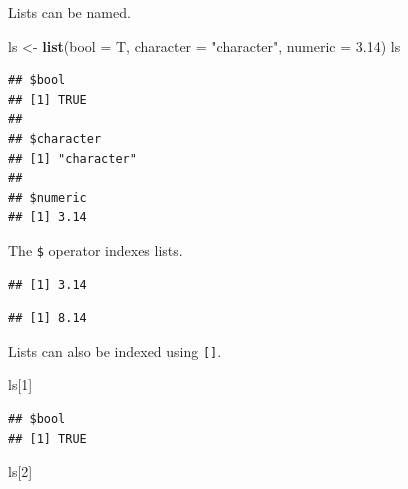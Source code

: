 \documentclass[openany]{book}
\newenvironment{Shaded}{\begin{snugshade}}{\end{snugshade}}
\newcommand{\DataTypeTok}[1]{\textcolor[rgb]{0.13,0.29,0.53}{#1}}
\newcommand{\DecValTok}[1]{\textcolor[rgb]{0.00,0.00,0.81}{#1}}
\newcommand{\FloatTok}[1]{\textcolor[rgb]{0.00,0.00,0.81}{#1}}
\newcommand{\KeywordTok}[1]{\textcolor[rgb]{0.13,0.29,0.53}{\textbf{#1}}}
\newcommand{\NormalTok}[1]{#1}
\newcommand{\OperatorTok}[1]{\textcolor[rgb]{0.81,0.36,0.00}{\textbf{#1}}}
\newcommand{\StringTok}[1]{\textcolor[rgb]{0.31,0.60,0.02}{#1}}
\begin{document}
Lists can be named.

\begin{Shaded}
\begin{Highlighting}[]
\NormalTok{ls <-}\StringTok{ }\KeywordTok{list}\NormalTok{(}\DataTypeTok{bool =}\NormalTok{ T, }\DataTypeTok{character =} \StringTok{"character"}\NormalTok{, }\DataTypeTok{numeric =} \FloatTok{3.14}\NormalTok{)}
\NormalTok{ls}
\end{Highlighting}
\end{Shaded}

\begin{verbatim}
## $bool
## [1] TRUE
## 
## $character
## [1] "character"
## 
## $numeric
## [1] 3.14
\end{verbatim}

The \texttt{\$} operator indexes lists.

\begin{Shaded}
\end{Shaded}

\begin{verbatim}
## [1] 3.14
\end{verbatim}

\begin{Shaded}
\end{Shaded}

\begin{verbatim}
## [1] 8.14
\end{verbatim}

Lists can also be indexed using \texttt{{[}{]}}.

\begin{Shaded}
\begin{Highlighting}[]
\NormalTok{ls[}\DecValTok{1}\NormalTok{]}
\end{Highlighting}
\end{Shaded}

\begin{verbatim}
## $bool
## [1] TRUE
\end{verbatim}

\begin{Shaded}
\begin{Highlighting}[]
\NormalTok{ls[}\DecValTok{2}\NormalTok{]}
\end{Highlighting}
\end{Shaded}
\end{document}
